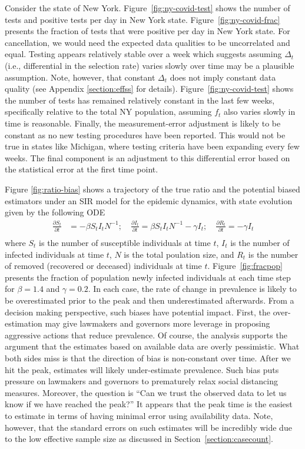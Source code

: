 \documentclass[aoas]{amsart}
\begin{document}
Consider the state of New York.  Figure~\ref{fig:ny-covid-test} shows the number of tests and positive tests per day in New York state.  Figure~\ref{fig:ny-covid-frac} presents the fraction of tests that were positive per day in New York state.  For cancellation, we would need the expected data qualities to be uncorrelated and equal. Testing appears relatively stable over a week which suggests assuming $\Delta_t$ (i.e., differential in the selection rate) varies slowly over time may be a plausible assumption.  Note, however, that constant $\Delta_t$ does not imply constant data quality (see Appendix \ref{section:effss} for details).  Figure~\ref{fig:ny-covid-test} shows the number of tests has remained relatively constant in the last few weeks, specifically relative to the total NY population, assuming $f_t$ also varies slowly in time is reasonable. Finally, the measurement-error adjustment is likely to be constant as no new testing procedures have been reported.  This would not be true in states like Michigan, where testing criteria have been expanding every few weeks.  The final component is an adjustment to this differential error based on the statistical error at the first time point.


Figure \ref{fig:ratio-bias} shows a trajectory of the true ratio and the potential biased estimators under an SIR model for the epidemic dynamics, with state evolution given by the following ODE
$$
\begin{aligned}
\frac{\partial S_t}{\partial t} &= - \beta S_t I_t N^{-1}; \quad
\frac{\partial I_t}{\partial t} = \beta S_t I_t N^{-1} - \gamma I_t; \quad
\frac{\partial R_t}{\partial t} = - \gamma I_t \\
\end{aligned}
$$
where $S_t$ is the number of susceptible individuals at time $t$, $I_t$ is the number of infected individuals at time $t$, $N$ is the total poulation size, and $R_t$ is the number of removed (recovered or deceased) individuals at time $t$.   Figure~\ref{fig:fracpop} presents the fraction of population newly infected individuals at each time step for $\beta = 1.4$ and $\gamma = 0.2$.  In each case, the rate of change in prevalence is likely to be  overestimated prior to the peak and then underestimated afterwards.  From a decision making perspective, such biases have potential impact.  First, the over-estimation may give lawmakers and governors more leverage in proposing aggressive actions that reduce prevalence.  Of course, the analysis supports the argument that the estimates based on available data are overly pessimistic. What both sides miss is that the direction of bias is non-constant over time.  After we hit the peak, estimates will likely under-estimate prevalence.  Such bias puts pressure on lawmakers and governors to prematurely relax social distancing measures.  Moreover, the question is ``Can we trust the observed data to let us know if we have reached the peak?''  It appears that the peak time is the easiest to estimate in terms of having minimal error using availability data.  Note, however, that the standard errors on such estimates will be incredibly wide due to the low effective sample size as discussed in Section~\ref{section:casecount}.
\end{document}
